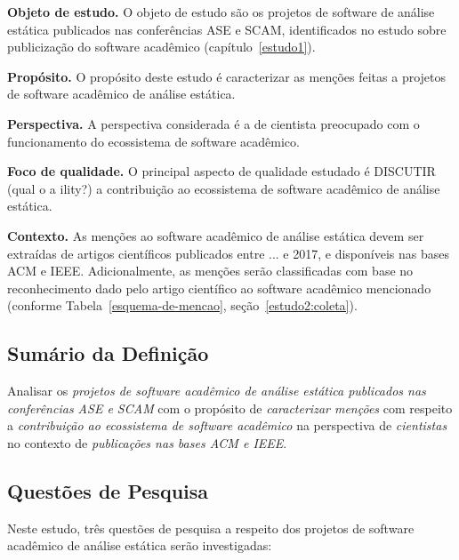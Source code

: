 \begin{description}
\item{\bf Objeto de estudo.} 
O objeto de estudo são os projetos de software de análise estática publicados nas conferências ASE e SCAM,
identificados no estudo sobre publicização do software acadêmico (capítulo~\ref{estudo1}).

\item{\bf Propósito.} 
O propósito deste estudo é caracterizar as menções feitas a 
projetos de software acadêmico de análise estática.

\item{\bf Perspectiva.} 
A perspectiva considerada é a de cientista preocupado com o funcionamento do ecossistema de software acadêmico.

\item{\bf Foco de qualidade.} 
O principal aspecto de qualidade estudado é 
DISCUTIR (qual o a ility?)
a contribuição ao ecossistema de software acadêmico de análise estática.

\item{\bf Contexto.} 
As menções ao software acadêmico de análise estática devem ser extraídas de 
artigos científicos publicados entre ... e 2017, e disponíveis nas bases ACM e IEEE.
Adicionalmente, as menções serão classificadas com base no 
reconhecimento dado pelo artigo científico ao software acadêmico mencionado
(conforme Tabela~\ref{esquema-de-mencao},  seção~\ref{estudo2:coleta}).
\end{description}

\subsection{Sumário da Definição}

Analisar os \textit{projetos de software acadêmico de análise estática publicados nas conferências ASE e SCAM}
com o propósito de \textit{caracterizar menções}
com respeito a \textit{contribuição ao ecossistema de software acadêmico}
na perspectiva de \textit{cientistas}
no contexto de \textit{publicações nas bases ACM e IEEE}.

\subsection{Questões de Pesquisa}

Neste estudo, três questões de pesquisa a respeito dos projetos de
software acadêmico de análise estática serão investigadas:

